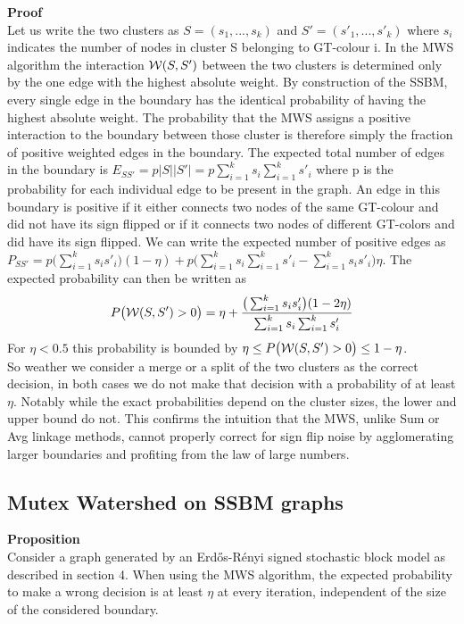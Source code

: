 \textbf{Proof} \\
Let us write the two clusters as $S=(s_1, ..., s_k)$ and $S'=(s'_1, ..., s'_k)$ where $s_i$ indicates the number of nodes in cluster S belonging to GT-colour i. In the MWS algorithm the interaction $\mathcal{W}(S,S')$ between the two clusters is determined only by the one edge with the highest absolute weight. By construction of the SSBM, every single edge in the boundary has the identical probability of having the highest absolute weight. The probability that the MWS assigns a positive interaction to the boundary between those cluster is therefore simply the fraction of positive weighted edges in the boundary. 
The expected total number of edges in the boundary is $E_{SS'}=p|S||S'|=p\sum_{i=1}^{k}s_i \sum_{i=1}^{k}s'_i$ where p is the probability for each individual edge to be present in the graph. An edge in this boundary is positive if it either connects two nodes of the same GT-colour and did not have its sign flipped or if it connects two nodes of different GT-colors and did have its sign flipped. We can write the expected number of positive edges as $P_{SS'}=p\big(\sum_{i=1}^{k}s_is'_i\big)(1-\eta)+p\big(\sum_{i=1}^{k}s_i \sum_{i=1}^{k}s'_i - \sum_{i=1}^{k}s_is'_i\big)\eta$. The expected probability can then be written as 
\begin{equation}
    P\big(\mathcal{W}(S,S')>0\big)=\eta +  \frac{\big(\sum_{i=1}^{k}s_is'_i\big)(1-2\eta)}{\sum_{i=1}^{k}s_i \sum_{i=1}^{k}s'_i}
\end{equation}
For $\eta <0.5$ this probability is bounded by $\eta \leq P\big(\mathcal{W}(S,S')>0\big) \leq 1-\eta$. \\
So weather we consider a merge or a split of the two clusters as the correct decision, in both cases we do not make that decision with a probability of at least $\eta$. Notably while the exact probabilities depend on the cluster sizes, the lower and upper bound do not. This confirms the intuition that the MWS, unlike Sum or Avg linkage methods, cannot properly correct for sign flip noise by agglomerating larger boundaries and profiting from the law of large numbers. 

\subsection{Mutex Watershed on SSBM graphs}
\textbf{Proposition} \\
Consider a graph generated by an Erd\H os-R\'enyi signed stochastic block model as described in section 4. When using the MWS algorithm, the expected probability to make a wrong decision is at least $\eta $ at every iteration, independent of the size of the considered boundary.  

